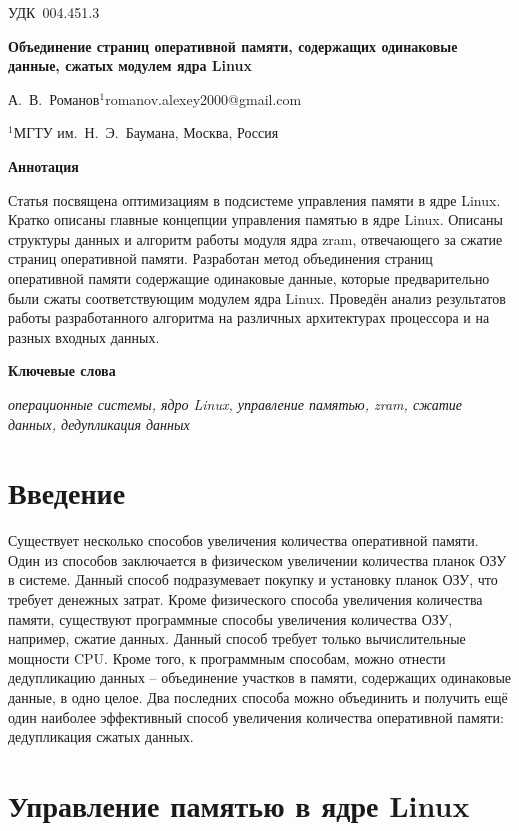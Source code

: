 \documentclass[12pt, a4paper]{article}
\begin{document}
\noindent УДК~004.451.3

\hfill

\noindent \textbf{Объединение страниц оперативной памяти, содержащих одинаковые данные, сжатых модулем ядра Linux}

\noindent А.~В.~Романов$^{1}$\hfill romanov.alexey2000@gmail.com

\noindent $^{1}$МГТУ им.~Н.~Э.~Баумана, Москва, Россия

\hfill

\noindent \textbf{Аннотация}

\noindent Статья посвящена оптимизациям в подсистеме управления памяти в ядре Linux. Кратко описаны главные концепции управления памятью в ядре Linux. Описаны структуры данных и алгоритм работы модуля ядра zram, отвечающего за сжатие страниц оперативной памяти. Разработан метод объединения страниц оперативной памяти содержащие одинаковые данные, которые предварительно были сжаты соответствующим модулем ядра Linux. Проведён анализ результатов работы разработанного алгоритма на различных архитектурах процессора и на разных входных данных.

\noindent \textbf{Ключевые слова}

\noindent \textit{операционные системы, ядро Linux, управление памятью, zram, сжатие данных, дедупликация данных}

\hfill

\section*{Введение}

Существует несколько способов увеличения количества оперативной памяти. Один из способов заключается в физическом увеличении количества планок ОЗУ в системе. Данный способ подразумевает покупку и установку планок ОЗУ, что требует денежных затрат. Кроме физического способа увеличения количества памяти, существуют программные способы увеличения количества ОЗУ, например, сжатие данных. Данный способ требует только вычислительные мощности CPU. Кроме того, к программным способам, можно отнести дедупликацию данных -- объединение участков в памяти, содержащих одинаковые данные, в одно целое. Два последних способа можно объединить и получить ещё один наиболее эффективный способ увеличения количества оперативной памяти: дедупликация сжатых данных.

\section{Управление памятью в ядре Linux}
\end{document}

